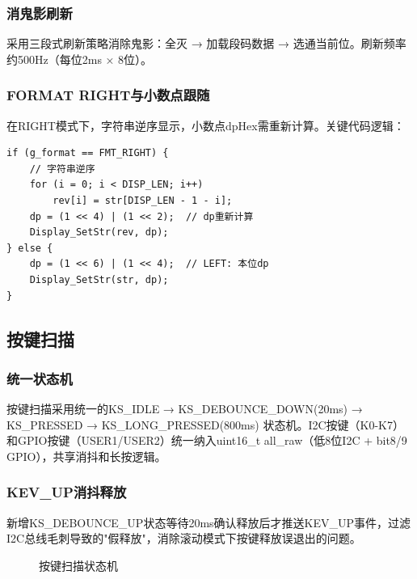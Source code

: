 \documentclass[12pt,hyperref,a4paper,UTF8]{ctexart}
\begin{document}
\subsubsection{消鬼影刷新}

采用三段式刷新策略消除鬼影：全灭 → 加载段码数据 → 选通当前位。刷新频率约500Hz（每位2ms × 8位）。

\subsubsection{FORMAT RIGHT与小数点跟随}

在RIGHT模式下，字符串逆序显示，小数点dpHex需重新计算。关键代码逻辑：
\begin{verbatim}
if (g_format == FMT_RIGHT) {
    // 字符串逆序
    for (i = 0; i < DISP_LEN; i++)
        rev[i] = str[DISP_LEN - 1 - i];
    dp = (1 << 4) | (1 << 2);  // dp重新计算
    Display_SetStr(rev, dp);
} else {
    dp = (1 << 6) | (1 << 4);  // LEFT: 本位dp
    Display_SetStr(str, dp);
}
\end{verbatim}

\subsection{按键扫描}

\subsubsection{统一状态机}

按键扫描采用统一的KS\_IDLE → KS\_DEBOUNCE\_DOWN(20ms) → KS\_PRESSED → KS\_LONG\_PRESSED(800ms) 状态机。I2C按键（K0-K7）和GPIO按键（USER1/USER2）统一纳入uint16\_t all\_raw（低8位I2C + bit8/9 GPIO），共享消抖和长按逻辑。

\subsubsection{KEV\_UP消抖释放}

新增KS\_DEBOUNCE\_UP状态等待20ms确认释放后才推送KEV\_UP事件，过滤I2C总线毛刺导致的"假释放"，消除滚动模式下按键释放误退出的问题。

\begin{figure}[!htbp]
    \centering
    \caption{按键扫描状态机}
    \label{fig:keystate}
\end{figure}
\end{document}
